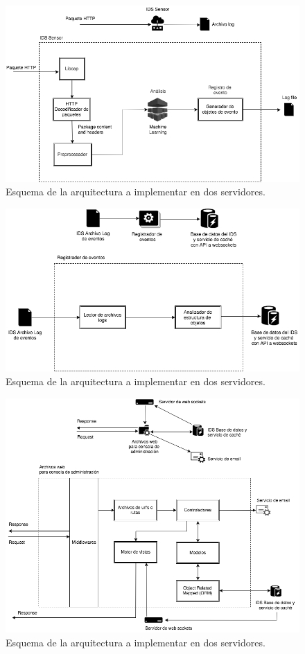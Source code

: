 \begin{figure}
	\centering
	\includegraphics[scale=.6]{images/IDS_Sensor}
	\caption{Esquema de la arquitectura a implementar en dos servidores.}
	\label{fig:ids_sensor}
\end{figure}

\begin{figure}
	\centering
	\includegraphics[scale=.6]{images/Worker}
	\caption{Esquema de la arquitectura a implementar en dos servidores.}
	\label{fig:ids_worker}
\end{figure}

\begin{figure}
	\centering
	\includegraphics[scale=.6]{images/Report_Viewer}
	\caption{Esquema de la arquitectura a implementar en dos servidores.}
	\label{fig:ids_report}
\end{figure}


